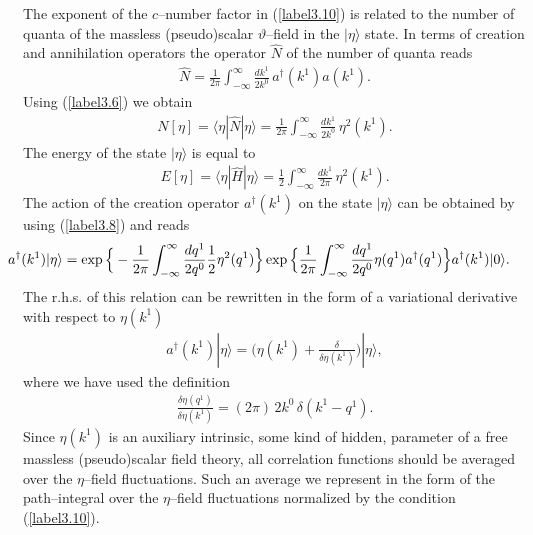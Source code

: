 \documentclass[a4paper,12pt] {article}
\begin{document}
%
The exponent of the $c$--number factor in (\ref{label3.10}) is related
to the number of quanta of the massless (pseudo)scalar
$\vartheta$--field in the $|\eta \rangle$ state. In terms of creation
and annihilation operators the operator $\hat{N}$ of the number of
quanta reads
%
\begin{eqnarray}\label{label3.11}
\hat{N} = \frac{1}{2\pi}\int^{\infty}_{-\infty}\frac{dk^1}{2k^0}\,
a^{\dagger}(k^1)a(k^1).
\end{eqnarray}
%
Using (\ref{label3.6}) we obtain
%
\begin{eqnarray}\label{label3.12}
N[\eta] = \langle \eta|\hat{N}|\eta \rangle = \frac{1}{2\pi}
\int^{\infty}_{-\infty}\frac{dk^1}{2k^0}\,\eta^2(k^1).
\end{eqnarray}
%
The energy of the state $|\eta \rangle$ is equal to 
%
\begin{eqnarray}\label{label3.13}
E[\eta] = \langle \eta|\hat{H}|\eta \rangle =\frac{1}{2}
\int^{\infty}_{-\infty}\frac{dk^1}{2\pi}\,\eta^2(k^1).
\end{eqnarray}
%
The action of the creation operator $a^{\dagger}(k^1)$ on the state
$|\eta\rangle$ can be obtained by using (\ref{label3.8}) and reads
%
\begin{eqnarray}\label{label3.14}
\hspace{-0.3in}a^{\dagger}(k^1)|\eta\rangle =
\exp\Big\{-\frac{1}{2\pi}\int^{\infty}_{-\infty}\frac{dq^1}{2q^0}
\frac{1}{2}\eta^2(q^1)\Big\}
\exp\Big\{\frac{1}{2\pi}\int^{\infty}_{-\infty}\frac{dq^1}{2q^0}
\eta(q^1)a^{\dagger}(q^1)\Big\}a^{\dagger}(k^1)|0\rangle.
\end{eqnarray}
%
The r.h.s. of this relation can be rewritten in the form of a
variational derivative with respect to $\eta(k^1)$
%
\begin{eqnarray}\label{label3.15}
a^{\dagger}(k^1)|\eta\rangle = \Big(\eta(k^1) + \frac{\delta}{\delta
\eta(k^1)}\Big)|\eta\rangle,
\end{eqnarray}
%
where we have used the definition
%
\begin{eqnarray}\label{label3.16}
\frac{\delta \eta(q^1)}{\delta \eta(k^1)} = (2\pi)\,2k^0\,\delta(k^1 -
q^1).
\end{eqnarray}
%
Since $\eta(k^1)$ is an auxiliary intrinsic, some kind of hidden,
parameter of a free massless (pseudo)scalar field theory, all
correlation functions should be averaged over the $\eta$--field
fluctuations. Such an average we represent in the form of the
path--integral over the $\eta$--field fluctuations normalized by the
condition (\ref{label3.10}).
\end{document}
